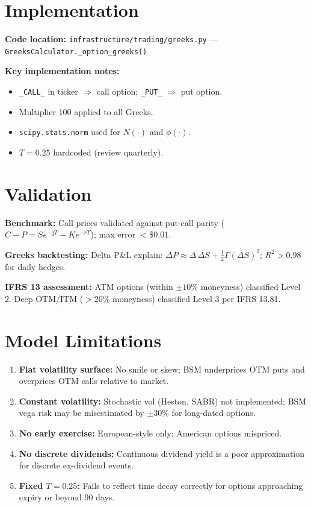\documentclass{apex_mdd}
\begin{document}
\section{Implementation}

\textbf{Code location:} \texttt{infrastructure/trading/greeks.py} --- \texttt{GreeksCalculator.\_option\_greeks()}

\textbf{Key implementation notes:}
\begin{itemize}
  \item \texttt{\_CALL\_} in ticker $\Rightarrow$ call option; \texttt{\_PUT\_} $\Rightarrow$ put option.
  \item Multiplier 100 applied to all Greeks.
  \item \texttt{scipy.stats.norm} used for $N(\cdot)$ and $\phi(\cdot)$.
  \item $T = 0.25$ hardcoded (review quarterly).
\end{itemize}

\section{Validation}

\textbf{Benchmark:} Call prices validated against put-call parity ($C - P = Se^{-qT} - Ke^{-rT}$); max error $<\$0.01$.

\textbf{Greeks backtesting:} Delta P\&L explain: $\Delta P \approx \Delta\,\Delta S + \tfrac{1}{2}\Gamma(\Delta S)^2$; $R^2 > 0.98$ for daily hedges.

\textbf{IFRS 13 assessment:} ATM options (within $\pm 10\%$ moneyness) classified Level 2. Deep OTM/ITM ($>$20\% moneyness) classified Level 3 per IFRS 13.81.

\section{Model Limitations}

\begin{enumerate}
  \item \textbf{Flat volatility surface:} No smile or skew; BSM underprices OTM puts and overprices OTM calls relative to market.
  \item \textbf{Constant volatility:} Stochastic vol (Heston, SABR) not implemented; BSM vega risk may be misestimated by $\pm 30\%$ for long-dated options.
  \item \textbf{No early exercise:} European-style only; American options mispriced.
  \item \textbf{No discrete dividends:} Continuous dividend yield is a poor approximation for discrete ex-dividend events.
  \item \textbf{Fixed $T=0.25$:} Fails to reflect time decay correctly for options approaching expiry or beyond 90 days.
\end{enumerate}
\end{document}
